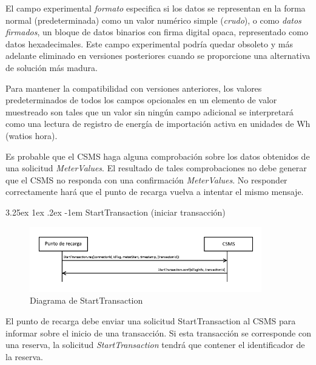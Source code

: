 \documentclass[12pt,a4paper,onecolumn,oneside]{report}
\makeatletter
\renewcommand\paragraph{\@startsection{paragraph}{5}{\z@}%
  {3.25ex \@plus1ex \@minus.2ex}%
  {-1em}%
  {\normalfont\normalsize\bfseries}}
\makeatother
\begin{document}
El campo experimental \textit{formato} especifica si los datos se representan en la forma normal (predeterminada) como un valor numérico simple (\textit{crudo}), o como \textit{datos firmados}, un bloque de datos binarios con firma digital opaca, representado como datos hexadecimales. Este campo experimental podría quedar obsoleto y más adelante eliminado en versiones posteriores cuando se proporcione una alternativa de solución más madura.

Para mantener la compatibilidad con versiones anteriores, los valores predeterminados de todos los campos opcionales en un elemento de valor muestreado son tales que un valor sin ningún campo adicional se interpretará como una lectura de registro de energía de importación activa en unidades de Wh (watios hora).

Es probable que el CSMS haga alguna comprobación sobre los datos obtenidos de una solicitud \textit{MeterValues}. El resultado de tales comprobaciones no debe generar que el CSMS no responda con una confirmación \textit{MeterValues}. No responder correctamente hará que el punto de recarga vuelva a intentar el mismo mensaje.



\paragraph{StartTransaction (iniciar transacción)}
\label{StartTransaction (iniciar transacción)}


\begin{figure}[H] 
\centering
  \includegraphics[width=0.9\textwidth]{figuras/diagramastarttransaction.png}
  \caption[Diagrama de \textit{StartTransaction}]{Diagrama de StartTransaction\\
  }
  \label{fig:diagramastarttransaction}
\end{figure}


El punto de recarga debe enviar una solicitud StartTransaction al CSMS para informar sobre el inicio de una transacción. Si esta transacción se corresponde con una reserva, la solicitud \textit{StartTransaction} tendrá que contener el identificador de la reserva.
\end{document}
